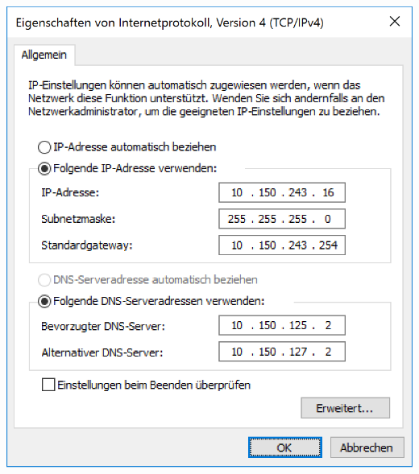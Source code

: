 \documentclass[a4paper,12pt]{scrartcl}
\begin{document}
\begin{minipage}{0.4\textwidth}
	\includegraphics[width=\linewidth]{Bilder/IP_Windows}
\end{minipage}
\end{document}
